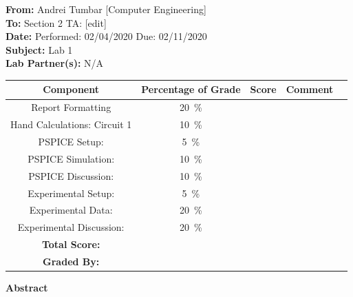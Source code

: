 \documentclass[11pt]{article}
\begin{document}
\Large
\textbf{From:} Andrei Tumbar [Computer Engineering] \\
\textbf{To: } Section 2 TA: [edit] \\
\textbf{Date: } Performed: 02/04/2020  Due: 02/11/2020 \\
\textbf{Subject: } Lab 1\\
\textbf{Lab Partner(s): } N/A\\
\vspace{0.5in}
	\begin{table}[h!]
		\centering
		\label{Table:Grading Table 1}
		\begin{tabular}{|c||c|c|c|c|}
			\hline
			Component & Percentage of Grade   & Score \hspace{0.25in} & Comment \hspace{1in}  \\
			\hline
			Report Formatting & 20~\si{\percent} & & \\	 
			\hline 
			Hand Calculations: Circuit 1 & 10~\si{\percent} & & \\
			\hline	
			PSPICE Setup: & 5~\si{\si{\percent}}&&\\
			\hline
			PSPICE Simulation:  & 10~\si{\percent} & & \\
			\hline
			PSPICE Discussion:  & 10~\si{\percent} & & \\
			\hline
			Experimental Setup: & 5~\si{\percent} & & \\
			\hline
		    Experimental Data:  & 20~\si{\percent} & & \\	
			\hline
			Experimental Discussion:  & 20~\si{\percent} & & \\	 
			\hline
			\textbf{Total Score:}&  & & \\	 
			\hline
			\textbf{Graded By:}&  & & \\	 
			\hline
			
		\end{tabular}
	\end{table}
\newpage
\Large \textbf{Abstract} \\
\normalsize
\end{document}
